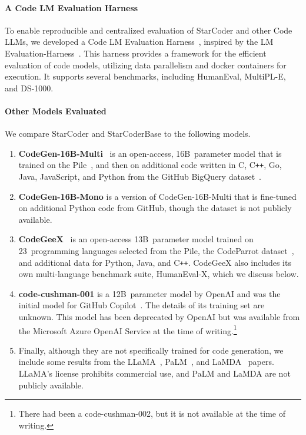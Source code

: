 \paragraph{A Code LM Evaluation Harness}

To enable reproducible and centralized evaluation of StarCoder and other Code LLMs, we developed a Code LM Evaluation Harness~\citep{bigcode-evaluation-harness}, inspired by the LM Evaluation-Harness~\citep{eval-harness}. This harness provides a framework for the efficient evaluation of code models, utilizing data parallelism and docker containers for execution. It supports several benchmarks, including HumanEval, MultiPL-E, and DS-1000.

\paragraph{Other Models Evaluated} We compare StarCoder and StarCoderBase to the following models.

\begin{enumerate}
\item \textbf{CodeGen-16B-Multi}~\citep{nijkamp:codegen} is an open-access, 16B~parameter model that is trained on the Pile~\citep{gao2020pile}, and then on additional code written in C, C\texttt{++}, Go, Java, JavaScript, and Python from the GitHub BigQuery dataset~\citep{smith2016bigquery}.

\item \textbf{CodeGen-16B-Mono} is a version of CodeGen-16B-Multi that is fine-tuned on additional Python code from GitHub, though the dataset is not publicly available.

\item \textbf{CodeGeeX}~\citep{qinkai:codegeex} is an open-access 13B~parameter model trained on 23~programming languages selected from the Pile, the CodeParrot dataset~\citep{wolf-etal-2020-transformers}, and additional data for Python, Java, and C\texttt{++}. CodeGeeX also includes its own multi-language benchmark suite, HumanEval-X, which we discuss below. 

\item \textbf{code-cushman-001} is a 12B~parameter model by OpenAI and was the initial model for GitHub Copilot~\citep{chen2021codex}. The details of its training set are unknown. This model has been deprecated by OpenAI but was available from the Microsoft Azure OpenAI Service at the time of writing.\footnote{There had been a code-cushman-002, but it is not available at the time of writing.}

\item Finally, although they are not specifically trained for code generation, we include some results from the LLaMA~\citep{touvron2023llama}, PaLM~\citep{chowdhery2022palm}, and LaMDA~\citep{thoppilan2022lamda} papers. LLaMA's license prohibits commercial use, and PaLM and LaMDA are not publicly available.

\end{enumerate}


